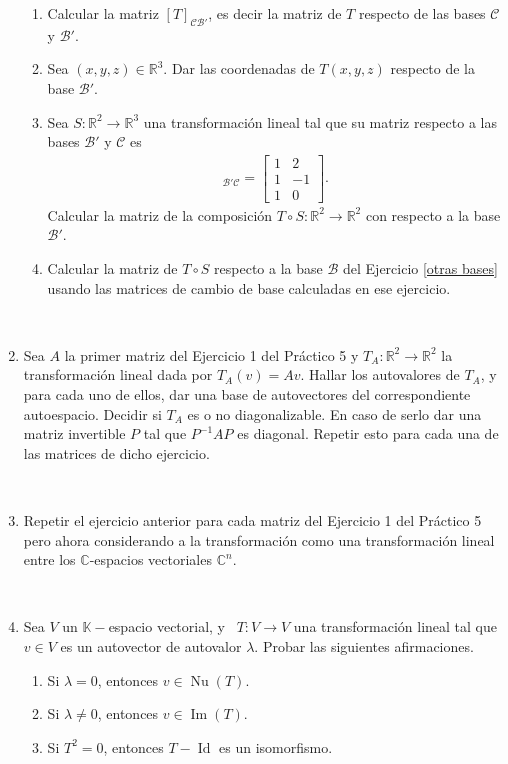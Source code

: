 \documentclass[12pt]{amsart}
\begin{document}
\begin{enumerate}
\begin{enumerate}
 \item Calcular la matriz $[T]_{\mathcal{C}\mathcal{B}'}$, es decir la matriz de $T$ respecto de las bases $\mathcal{C}$ y $\mathcal{B}'$.
 \item Sea $(x,y,z)\in\mathbb{R}^3$. Dar las coordenadas de $T(x,y,z)$ respecto de la base $\mathcal{B}'$.
 \item Sea $S:\mathbb{R}^2\longrightarrow\mathbb{R}^3$ una transformaci\'on lineal tal que su matriz respecto a las bases $\mathcal{B}'$ y $\mathcal{C}$ es
 \begin{align*}
[S]_{\mathcal{B}'\mathcal{C}}=\left[\begin{array}{cr}
1&2\\1&-1\\1&0
\end{array}\right].
 \end{align*}
Calcular la matriz de la composici\'on $T\circ S:\mathbb{R}^2\longrightarrow\mathbb{R}^2$ con respecto a la base $\mathcal{B}'$.
\item Calcular la matriz de $T\circ S$ respecto a la base $\mathcal{B}$ del Ejercicio \eqref{otras bases} usando las matrices de cambio de base calculadas en ese ejercicio.
\end{enumerate}

\

\item Sea $A$ la primer matriz del Ejercicio 1 del Pr\'actico 5 y $T_A:\mathbb{R}^2\longrightarrow\mathbb{R}^2$ la transformaci\'on lineal dada por $T_A(v)=Av$. Hallar los autovalores de $T_A$, y para cada uno de ellos, dar una base de autovectores del correspondiente autoespacio. Decidir si $T_A$ es o no diagonalizable. En caso de serlo dar una matriz invertible $P$ tal que $P^{-1}AP$ es diagonal. Repetir esto para cada una de las matrices de dicho ejercicio.

\

\item Repetir el ejercicio anterior para cada matriz del Ejercicio 1 del Pr\'actico 5 pero ahora considerando a la transformaci\'on como una transformaci\'on lineal entre los $\mathbb{C}$-espacios vectoriales $\mathbb{C}^n$.

\

\item Sea $V$ un $\mathbb{K}-$espacio vectorial, y \ $T:V\longrightarrow V$ una transformaci\'on lineal tal que $v\in V$ es un autovector de autovalor $\lambda$. Probar las siguientes afirmaciones.
\begin{enumerate}
 \item Si $\lambda=0$, entonces $v\in\operatorname{Nu}(T)$.
 \item Si $\lambda\neq0$, entonces $v\in\operatorname{Im}(T)$.
  \item Si $T^2=0$, entonces $T-\operatorname{Id}$ es un isomorfismo.
\end{enumerate}


\end{enumerate}
\end{document}
